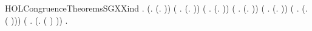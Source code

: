 \newcommand{\HOLCongruenceTheoremsSGXXIMPXXWG}{\UseVerbatim{HOLCongruenceTheoremsSGXXIMPXXWG}}
\begin{SaveVerbatim}{HOLCongruenceTheoremsSGXXind}
\HOLTokenTurnstile{} \HOLSymConst{\HOLTokenForall{}}.
       (\HOLSymConst{\HOLTokenForall{}}.  (\HOLTokenLambda{}. )) \HOLSymConst{\HOLTokenConj{}}
       (\HOLSymConst{\HOLTokenForall{}} .   \HOLSymConst{\HOLTokenImp{}}  (\HOLTokenLambda{}.   )) \HOLSymConst{\HOLTokenConj{}}
       (\HOLSymConst{\HOLTokenForall{}} .   \HOLSymConst{\HOLTokenImp{}}  (\HOLTokenLambda{}.  )) \HOLSymConst{\HOLTokenConj{}}
       (\HOLSymConst{\HOLTokenForall{}} .   \HOLSymConst{\HOLTokenConj{}}   \HOLSymConst{\HOLTokenImp{}}  (\HOLTokenLambda{}.   \HOLSymConst{+}  )) \HOLSymConst{\HOLTokenConj{}}
       (\HOLSymConst{\HOLTokenForall{}} .   \HOLSymConst{\HOLTokenConj{}}   \HOLSymConst{\HOLTokenImp{}}  (\HOLTokenLambda{}.   \HOLSymConst{\ensuremath{\parallel}}  )) \HOLSymConst{\HOLTokenConj{}}
       (\HOLSymConst{\HOLTokenForall{}} .   \HOLSymConst{\HOLTokenImp{}}  (\HOLTokenLambda{}. \HOLConst{\ensuremath{\nu}}  ( ))) \HOLSymConst{\HOLTokenConj{}}
       (\HOLSymConst{\HOLTokenForall{}} .   \HOLSymConst{\HOLTokenImp{}}  (\HOLTokenLambda{}.  ( ) )) \HOLSymConst{\HOLTokenImp{}}
       \HOLSymConst{\HOLTokenForall{}}.   \HOLSymConst{\HOLTokenImp{}}  
\end{SaveVerbatim}

